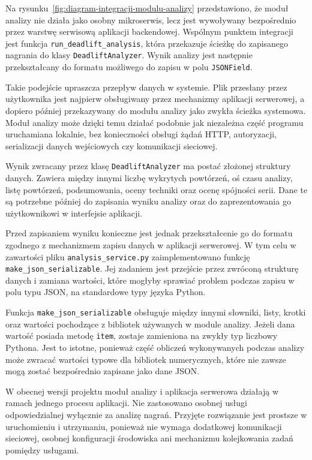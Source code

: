 Na rysunku~\ref{fig:diagram-integracji-modulu-analizy} przedstawiono, że moduł analizy nie działa jako osobny mikroserwis, lecz jest wywoływany bezpośrednio przez warstwę serwisową aplikacji backendowej. Wspólnym punktem integracji jest funkcja \texttt{run\_deadlift\_analysis}, która przekazuje ścieżkę do zapisanego nagrania do klasy \texttt{DeadliftAnalyzer}. Wynik analizy jest następnie przekształcany do formatu możliwego do zapisu w polu \texttt{JSONField}.

Takie podejście upraszcza przepływ danych w systemie. Plik przesłany przez użytkownika jest najpierw obsługiwany przez mechanizmy aplikacji serwerowej, a dopiero później przekazywany do modułu analizy jako zwykła ścieżka systemowa. Moduł analizy może dzięki temu działać podobnie jak niezależna część programu uruchamiana lokalnie, bez konieczności obsługi żądań HTTP, autoryzacji, serializacji danych wejściowych czy komunikacji sieciowej.

Wynik zwracany przez klasę \texttt{DeadliftAnalyzer} ma postać złożonej struktury danych. Zawiera między innymi liczbę wykrytych powtórzeń, oś czasu analizy, listę powtórzeń, podsumowania, oceny techniki oraz ocenę spójności serii. Dane te są potrzebne później do zapisania wyniku analizy oraz do zaprezentowania go użytkownikowi w interfejsie aplikacji.

Przed zapisaniem wyniku konieczne jest jednak przekształcenie go do formatu zgodnego z mechanizmem zapisu danych w aplikacji serwerowej. W tym celu w zawartości pliku \texttt{analysis\_service.py} zaimplementowano funkcję \texttt{make\_json\_serializable}. Jej zadaniem jest przejście przez zwróconą strukturę danych i zamiana wartości, które mogłyby sprawiać problem podczas zapisu w polu typu JSON, na standardowe typy języka Python.

Funkcja \texttt{make\_json\_serializable} obsługuje między innymi słowniki, listy, krotki oraz wartości pochodzące z bibliotek używanych w module analizy. Jeżeli dana wartość posiada metodę \texttt{item}, zostaje zamieniona na zwykły typ liczbowy Pythona. Jest to istotne, ponieważ część obliczeń wykonywanych podczas analizy może zwracać wartości typowe dla bibliotek numerycznych, które nie zawsze mogą zostać bezpośrednio zapisane jako dane JSON.

W obecnej wersji projektu moduł analizy i aplikacja serwerowa działają w ramach jednego procesu aplikacji. Nie zastosowano osobnej usługi odpowiedzialnej wyłącznie za analizę nagrań. Przyjęte rozwiązanie jest prostsze w uruchomieniu i utrzymaniu, ponieważ nie wymaga dodatkowej komunikacji sieciowej, osobnej konfiguracji środowiska ani mechanizmu kolejkowania zadań pomiędzy usługami.

